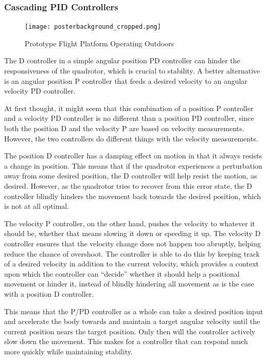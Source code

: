\documentclass[12pt,letterpaper]{article}
\begin{document}
\subsubsection*{Cascading PID Controllers}

\begin{figure}[h!]
\texttt{[image: posterbackground\_cropped.png]}
\caption{Prototype Flight Platform Operating Outdoors}
\label{fig:flight}
\end{figure}

The D controller in a simple angular position PD controller can hinder the
responsiveness of the quadrotor, which is crucial to stability. A better
alternative is an angular position P controller that feeds a desired velocity
to an angular velocity PD controller.

At first thought, it might seem that this combination of a position P
controller and a velocity PD controller is no different than a position PD
controller, since both the position D and the velocity P are based on velocity
measurements. However, the two controllers do different things with the
velocity measurements.

The position D controller has a damping effect on motion in that it always
resists a change in position. This means that if the quadrotor experiences a
perturbation away from some desired position, the D controller will help resist
the motion, as desired. However, as the quadrotor tries to recover from this
error state, the D controller blindly hinders the movement back towards the
desired position, which is not at all optimal.

The velocity P controller, on the other hand, pushes the velocity to whatever
it should be, whether that means slowing it down or speeding it up. The
velocity D controller ensures that the velocity change does not happen too
abruptly, helping reduce the chance of overshoot. The controller is able to do
this by keeping track of a desired velocity in addition to the current
velocity, which provides a context upon which the controller can ``decide''
whether it should help a positional movement or hinder it, instead of blindly
hindering all movement as is the case with a position D controller.

This means that the P/PD controller as a whole can take a desired position
input and accelerate the body towards and maintain a target angular velocity
until the current position nears the target position. Only then will the
controller actively slow down the movement. This makes for a controller that
can respond much more quickly while maintaining stability.
\end{document}
